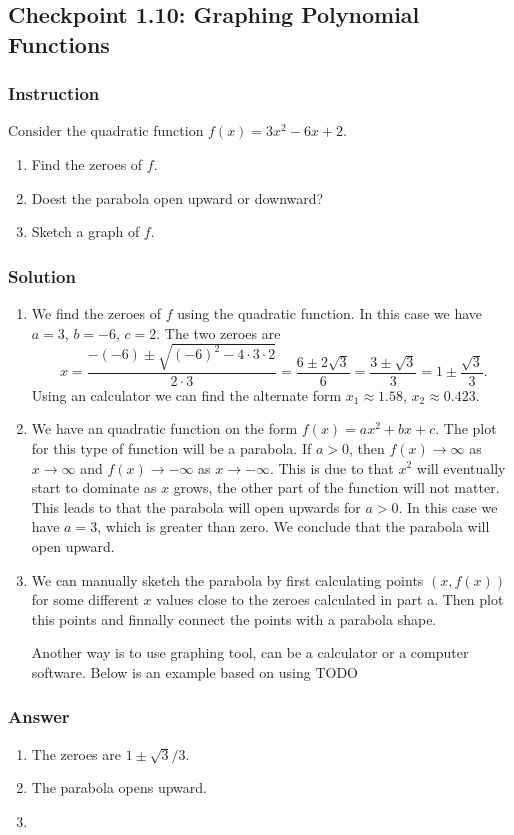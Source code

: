 \subsection*{Checkpoint 1.10: Graphing Polynomial Functions}

\subsubsection*{Instruction}

Consider the quadratic function $ f(x) = 3x^2 -6x + 2 $.

\begin{enumerate}[label = (\alph*)]
  \item
    Find the zeroes of $ f $.
  \item
    Doest the parabola open upward or downward?
  \item
    Sketch a graph of $ f $.
\end{enumerate}

\subsubsection*{Solution}

\begin{enumerate}[label = (\alph*)]
  \item
    We find the zeroes of $ f $ using the quadratic function. In this case we have $ a = 3 $, $ b = -6 $, $ c = 2 $. The two zeroes are
    $$ \phantom{.}
    x = \frac{-(-6) \pm \sqrt{(-6)^2 - 4 \cdot 3 \cdot 2}}{2 \cdot 3} = \frac{6 \pm 2\sqrt{3}}{6} = \frac{3 \pm \sqrt{3}}{3} = 1 \pm \frac{\sqrt{3}}{3}
    .$$
    Using an calculator we can find the alternate form $ x_1 \approx 1.58 $, $ x_2 \approx 0.423 $.
  \item
    We have an quadratic function on the form $ f(x) = ax^2 + bx + c $. The plot for this type of function will be a parabola. If $ a > 0 $, then $ f(x) \to \infty $ as $ x \to \infty $ and $ f(x) \to -\infty $ as $ x \to -\infty $. This is due to that $ x^2 $ will eventually start to dominate as $ x $ grows, the other part of the function will not matter. This leads to that the parabola will open upwards for $ a > 0 $. In this case we have $ a = 3 $, which is greater than zero. We conclude that the parabola will open upward.
  \item
    We can manually sketch the parabola by first calculating points $ (x, f(x)) $ for some different $ x $ values close to the zeroes calculated in part a. Then plot this points and finnally connect the points with a parabola shape.

    Another way is to use graphing tool, can be a calculator or a computer software. Below is an example based on using TODO
\end{enumerate}

\subsubsection{Answer}

\begin{enumerate}[label = (\alph*)]
  \item
    The zeroes are $ 1 \pm {\sqrt{3}}/3 $.
  \item
    The parabola opens upward.
  \item
\end{enumerate}
